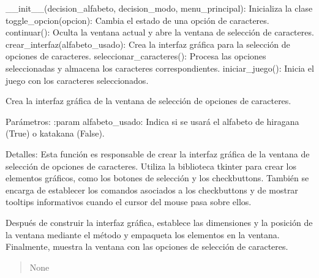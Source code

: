 \documentclass[letterpaper,10pt,spanish]{sphinxmanual}
\begin{document}
\begin{fulllineitems}
\begin{description}
\sphinxAtStartPar
\_\_init\_\_(decision\_alfabeto, decision\_modo, menu\_principal): Inicializa la clase
toggle\_opcion(opcion): Cambia el estado de una opción de caracteres.
continuar(): Oculta la ventana actual y abre la ventana de selección de caracteres.
crear\_interfaz(alfabeto\_usado): Crea la interfaz gráfica para la selección de opciones de caracteres.
seleccionar\_caracteres(): Procesa las opciones seleccionadas y almacena los caracteres correspondientes.
iniciar\_juego(): Inicia el juego con los caracteres seleccionados.

\end{description}

\begin{fulllineitems}
\label{\detokenize{menu_juego:menu_juego.CaracteresSelector.crear_interfaz}}
\pysigstartsignatures
{}
\pysigstopsignatures
\sphinxAtStartPar
Crea la interfaz gráfica de la ventana de selección de opciones de caracteres.

\sphinxAtStartPar
Parámetros:
:param alfabeto\_usado: Indica si se usará el alfabeto de hiragana (True) o katakana (False).

\sphinxAtStartPar
Detalles:
Esta función es responsable de crear la interfaz gráfica de la ventana de selección de opciones de
caracteres. Utiliza la biblioteca tkinter para crear los elementos gráficos, como los botones de selección y
los checkbuttons. También se encarga de establecer los comandos asociados a los checkbuttons y de mostrar
tooltips informativos cuando el cursor del mouse pasa sobre ellos.

\sphinxAtStartPar
Después de construir la interfaz gráfica, establece las dimensiones y la posición de la ventana mediante el
método  y empaqueta los elementos en la ventana. Finalmente, muestra la ventana con las opciones de
selección de caracteres.
\begin{quote}\begin{description}
\sphinxAtStartPar
None

\end{description}\end{quote}

\end{fulllineitems}


\end{fulllineitems}
\end{document}
